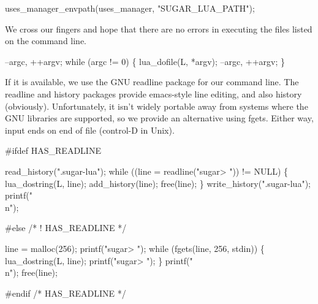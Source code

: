 \nwenddocs{}\endmoddef
uses_manager_envpath(uses_manager, "SUGAR_LUA_PATH");
\nwendcode{}\nwdocspar

We cross our fingers and hope that there are no errors in executing
the files listed on the command line.

\nwenddocs{}\endmoddef
--argc, ++argv;
while (argc != 0) \{
    lua_dofile(L, *argv);
    --argc, ++argv;
\}
\nwendcode{}\nwdocspar

If it is available, we use the GNU readline package for
our command line.  The readline and history packages provide
emacs-style line editing, and also history (obviously).
Unfortunately, it isn't widely portable away from systems
where the GNU libraries are supported, so we provide an
alternative using fgets.  Either way, input ends on end of file
(control-D in Unix).

\nwenddocs{}\endmoddef
#ifdef HAS_READLINE

read_history(".sugar-lua");
while ((line = readline("sugar> ")) != NULL) \{
    lua_dostring(L, line);
    add_history(line);
    free(line);
\}
write_history(".sugar-lua");
printf("\\n");

#else /* ! HAS_READLINE */

line = malloc(256);
printf("sugar> ");
while (fgets(line, 256, stdin)) \{
    lua_dostring(L, line);
    printf("sugar> ");
\}
printf("\\n");
free(line);

#endif /* HAS_READLINE */

\nwendcode{}

%
%
%
%
%
%
%
\nwdocspar


\nwenddocs{}

